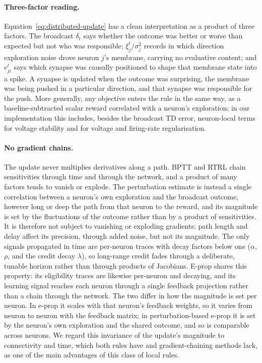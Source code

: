 \documentclass[10pt,twocolumn]{article}
\newcommand{\method}{perturbation-based e-prop}   %
\begin{document}
\paragraph{Three-factor reading.}
Equation~\eqref{eq:distributed-update} has a clean interpretation as a product
of three factors. The broadcast $\delta_t$ says whether the outcome was better
or worse than expected but not who was responsible; $\xi^t_j/\sigma_j^2$ records
in which direction exploration noise drove neuron $j$'s membrane, carrying no
evaluative content; and $e^t_{ji}$ says which synapse was causally positioned
to shape that membrane state into a spike. A synapse is updated when the
outcome was surprising, the membrane was being pushed in a particular
direction, and that synapse was responsible for the push. More generally, any
objective enters the rule in the same way, as a baseline-subtracted scalar
reward correlated with a neuron's exploration; in our implementation this
includes, besides the broadcast TD error, neuron-local terms for voltage
stability and for voltage and firing-rate regularisation.

\paragraph{No gradient chains.}
The update never multiplies derivatives along a path. BPTT and RTRL chain
sensitivities through time and through the network, and a product of many
factors tends to vanish or explode. The perturbation estimate is instead a
single correlation between a neuron's own exploration and the broadcast
outcome, however long or deep the path from that neuron to the reward, and its
magnitude is set by the fluctuations of the outcome rather than by a product of
sensitivities. It is therefore not subject to vanishing or exploding gradients:
path length and delay affect its precision, through added noise, but not its
magnitude. The only signals propagated in time are per-neuron traces with decay
factors below one ($\alpha$, $\rho$, and the credit decay $\lambda$), so
long-range credit fades through a deliberate, tunable horizon rather than
through products of Jacobians. E-prop shares this property: its eligibility
traces are likewise per-neuron and decaying, and its learning signal reaches
each neuron through a single feedback projection rather than a chain through the
network. The two differ in how the magnitude is set per neuron. In e-prop it
scales with that neuron's feedback weights, so it varies from neuron to neuron
with the feedback matrix; in \method{} it is set by the neuron's own
exploration and the shared outcome, and so is comparable across neurons. We
regard this invariance of the update's magnitude to connectivity and time, which
both rules have and gradient-chaining methods lack, as one of the main
advantages of this class of local rules.
\end{document}
